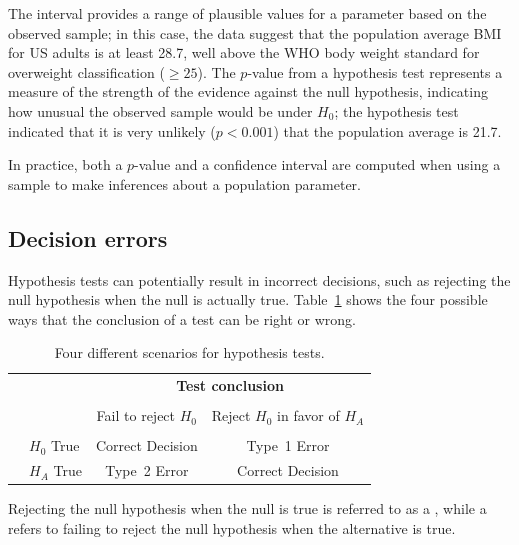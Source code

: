 \begin{spacing}{1.5}
\begin{example}
The interval provides a range of plausible values for a parameter based on the observed sample; in this case, the data suggest that the population average BMI for US adults is at least 28.7, well above the WHO body weight standard for overweight classification ($\geq 25$). The $p$-value from a hypothesis test represents a measure of the strength of the evidence against the null hypothesis, indicating how unusual the observed sample would be under $H_0$; the hypothesis test indicated that it is very unlikely ($p < 0.001$) that the population average is 21.7. 

In practice, both a $p$-value and a confidence interval are computed when using a sample to make inferences about a population parameter.

\end{example}

\subsection{Decision errors}

Hypothesis tests can potentially result in incorrect decisions, such as rejecting the null hypothesis when the null is actually true. Table~\ref{fourHTScenarios} shows the four possible ways that the conclusion of a test can be right or wrong.

\begin{table}[ht]
	\centering
	\begin{tabular}{l l c c}
		& & \multicolumn{2}{c}{\textbf{Test conclusion}} \\
		\cline{3-4}
		\vspace{-3.7mm} \\
		& & Fail to reject $H_0$ &  Reject $H_0$ in favor of $H_A$ \\
		\cline{2-4}
		\vspace{-3.7mm} \\
		& $H_0$ True & Correct Decision &  Type~1 Error \\
		\raisebox{1.5ex}{\textbf{Reality}} & $H_A$ True & Type~2 Error & Correct Decision\\
		\cline{2-4}
	\end{tabular}
	\caption{Four different scenarios for hypothesis tests.}
	\label{fourHTScenarios}
\end{table}

Rejecting the null hypothesis when the null is true is referred to as a , while a  refers to failing to reject the null hypothesis when the alternative is true. 


\end{spacing}
